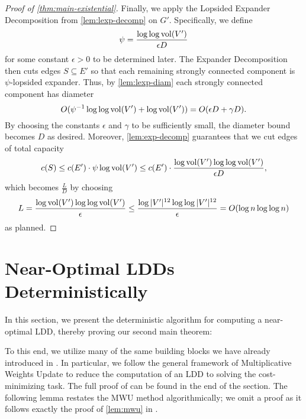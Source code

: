 \documentclass[letterpaper,11pt]{article}
\begin{document}
\begin{proof}[Proof of \cref{thm:main-existential}]
Finally, we apply the Lopsided Expander Decomposition from \cref{lem:lexp-decomp} on $G'$. Specifically, we define
\begin{equation*}
	\psi = \frac{\log\log \operatorname{vol}(V')}{\epsilon D}
\end{equation*}
for some constant $\epsilon > 0$ to be determined later. The Expander Decomposition then cuts edges $S \subseteq E'$ so that each remaining strongly connected component is $\psi$-lopsided expander. Thus, by \cref{lem:lexp-diam} each strongly connected component has diameter
\begin{equation*}
	O(\psi^{-1} \log\log \operatorname{vol}(V') + \log \operatorname{vol}(V')) = O(\epsilon D + \gamma D).
\end{equation*}
By choosing the constants $\epsilon$ and $\gamma$ to be sufficiently small, the diameter bound becomes $D$ as desired. Moreover, \cref{lem:exp-decomp} guarantees that we cut edges of total capacity
\begin{equation*}
	c(S) \leq c(E') \cdot \psi \log \operatorname{vol}(V') \leq c(E') \cdot \frac{\log \operatorname{vol}(V') \log\log \operatorname{vol}(V')}{\epsilon D},
\end{equation*}
which becomes $\frac{L}{D}$ by choosing
\begin{equation*}
	L = \frac{\log \operatorname{vol}(V') \log\log \operatorname{vol}(V')}{\epsilon} \leq \frac{\log |V'|^{12} \log\log |V'|^{12}}{\epsilon} = O(\log n \log\log n)
\end{equation*}
as planned.
\end{proof} \section{Near-Optimal LDDs Deterministically} \label{sec:ldd-deterministic}
In this section, we present the deterministic algorithm for computing a near-optimal LDD, thereby proving our second main theorem:

\thmMainDet*

To this end, we utilize many of the same building blocks we have already introduced in . In particular, we follow the general framework of Multiplicative Weights Update to reduce the computation of an LDD to solving the cost-minimizing task. The full proof of  can be found in the end of the section. The following lemma restates the MWU method algorithmically; we omit a proof as it follows exactly the proof of \cref{lem:mwu} in . 
\end{document}
